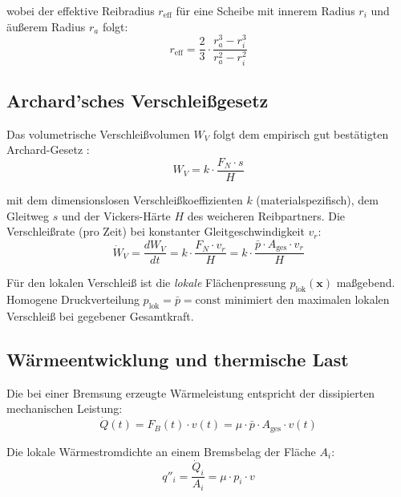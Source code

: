﻿\documentclass[12pt,a4paper]{article}
\theoremstyle{definition}
\begin{document}
\noindent wobei der effektive Reibradius $r_{\text{eff}}$ für eine
Scheibe mit innerem Radius $r_i$ und äußerem Radius $r_a$ folgt:
\begin{equation}
  r_{\text{eff}} = \frac{2}{3} \cdot \frac{r_a^3 - r_i^3}{r_a^2 - r_i^2}
  \label{eq:r_eff}
\end{equation}

\subsection{Archard'sches Verschleißgesetz}

Das volumetrische Verschleißvolumen $W_V$ folgt dem empirisch gut bestätigten
Archard-Gesetz \cite{archard1953}:
\begin{equation}
  W_V = k \cdot \frac{F_N \cdot s}{H}
  \label{eq:archard}
\end{equation}

mit dem dimensionslosen Verschleißkoeffizienten $k$ (materialspezifisch),
dem Gleitweg $s$ und der Vickers-Härte $H$ des weicheren Reibpartners.
Die Verschleißrate (pro Zeit) bei konstanter Gleitgeschwindigkeit $v_r$:
\begin{equation}
  \dot{W}_V = \frac{dW_V}{dt} = k \cdot \frac{F_N \cdot v_r}{H}
            = k \cdot \frac{\bar{p} \cdot A_{\text{ges}} \cdot v_r}{H}
  \label{eq:verschleissrate}
\end{equation}

Für den lokalen Verschleiß ist die \emph{lokale} Flächenpressung
$p_{\text{lok}}(\mathbf{x})$ maßgebend.  Homogene Druckverteilung
$p_{\text{lok}} = \bar{p} = \text{const}$ minimiert den maximalen
lokalen Verschleiß bei gegebener Gesamtkraft.

\subsection{Wärmeentwicklung und thermische Last}

Die bei einer Bremsung erzeugte Wärmeleistung entspricht der dissipierten
mechanischen Leistung:
\begin{equation}
  \dot{Q}(t) = F_B(t) \cdot v(t) = \mu \cdot \bar{p} \cdot A_{\text{ges}} \cdot v(t)
  \label{eq:waermeleistung}
\end{equation}

Die lokale Wärmestromdichte an einem Bremsbelag der Fläche $A_i$:
\begin{equation}
  q''_i = \frac{\dot{Q}_i}{A_i} = \mu \cdot p_i \cdot v
  \label{eq:waermestromdichte}
\end{equation}
\end{document}
